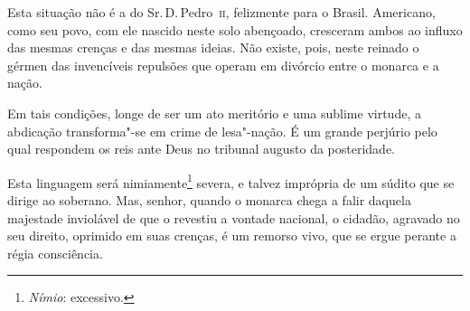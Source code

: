 \begin{linenumbers}
Esta situação não é a do Sr.\,D.\,Pedro~\textsc{ii}, felizmente para o Brasil.
Americano, como seu povo, com ele nascido neste solo abençoado,
cresceram ambos ao influxo das mesmas crenças e das mesmas ideias. Não
existe, pois, neste reinado o gérmen das invencíveis repulsões que
operam em divórcio entre o monarca e a nação. 

Em tais condições, longe de ser um ato meritório e uma sublime virtude,
a abdicação transforma"-se em crime de lesa"-nação. É um grande
perjúrio pelo qual respondem os reis ante Deus no tribunal augusto da posteridade. 

Esta linguagem será nimiamente\footnote{\textit{Nímio}: excessivo.}
severa, e talvez imprópria de um súdito que se dirige ao soberano. Mas,
senhor, quando o monarca chega a falir daquela majestade inviolável de
que o revestiu a vontade nacional, o cidadão, agravado no seu direito,
oprimido em suas crenças, é um remorso vivo, que se ergue perante a régia consciência.

\end{linenumbers}

\setcounter{@sectionNumCenter}{1}

\sectionitem 

